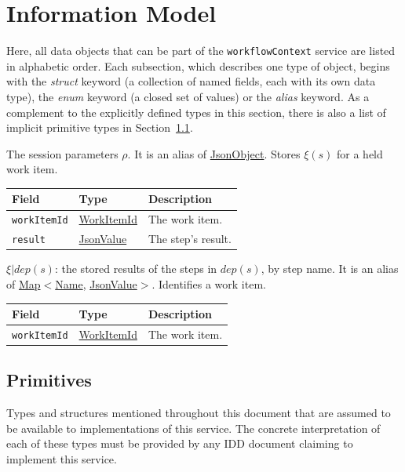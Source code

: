 \documentclass[a4paper]{arrowhead}
\newcommand{\pref}[1]{{\textcolor{ArrowheadGrey}{\hyperref[sec:model:primitives:#1]{#1}}}}
\begin{document}
\newpage
\section{Information Model}
\label{sec:model}
Here, all data objects that can be part of the \texttt{workflowContext} service are listed in alphabetic order. Each
subsection, which describes one type of object, begins with the \textit{struct} keyword (a collection of named fields,
each with its own data type), the \textit{enum} keyword (a closed set of values) or the \textit{alias} keyword. As a
complement to the explicitly defined types in this section, there is also a list of implicit primitive types in
Section~\ref{sec:model:primitives}.

The session parameters $\rho$.
 It is an alias of \pref{JsonObject}.
Stores $\xi(s)$ for a held work item.

{\small
\begin{longtable}{|p{3.9cm}|p{4.4cm}|p{7.5cm}|}

\hline
\rowcolor{gray!33} Field & Type & Description \\ \hline
\endhead
\texttt{workItemId} & \pref{WorkItemId} & The work item. \\ \hline
\texttt{result} & \pref{JsonValue} & The step's result. \\ \hline
\end{longtable}
}

$\xi|dep(s)$: the stored results of the steps in $dep(s)$, by step name.
 It is an alias of \pref{Map}$<$\pref{Name}, \pref{JsonValue}$>$.
Identifies a work item.

{\small
\begin{longtable}{|p{3.9cm}|p{4.4cm}|p{7.5cm}|}

\hline
\rowcolor{gray!33} Field & Type & Description \\ \hline
\endhead
\texttt{workItemId} & \pref{WorkItemId} & The work item. \\ \hline
\end{longtable}
}


\subsection{Primitives}
\label{sec:model:primitives}
Types and structures mentioned throughout this document that are assumed to be available to implementations of this
service. The concrete interpretation of each of these types must be provided by any IDD document claiming to implement
this service.
\end{document}
